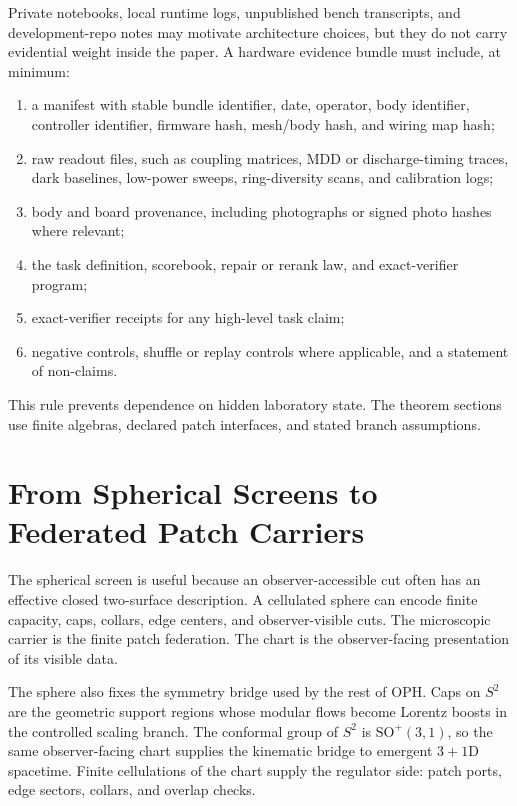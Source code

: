 \documentclass[11pt]{article}
\theoremstyle{remark}
\theoremstyle{plain}
\begin{document}
Private notebooks, local runtime logs, unpublished bench transcripts, and development-repo notes
may motivate architecture choices, but they do not carry evidential weight inside the paper. A
hardware evidence bundle must include, at minimum:
\begin{enumerate}[leftmargin=2em]
\item a manifest with stable bundle identifier, date, operator, body identifier, controller
identifier, firmware hash, mesh/body hash, and wiring map hash;
\item raw readout files, such as coupling matrices, MDD or discharge-timing traces, dark
baselines, low-power sweeps, ring-diversity scans, and calibration logs;
\item body and board provenance, including photographs or signed photo hashes where relevant;
\item the task definition, scorebook, repair or rerank law, and exact-verifier program;
\item exact-verifier receipts for any high-level task claim;
\item negative controls, shuffle or replay controls where applicable, and a statement of
non-claims.
\end{enumerate}

This rule prevents dependence on hidden laboratory state. The theorem sections use finite
algebras, declared patch interfaces, and stated branch assumptions.

\section{From Spherical Screens to Federated Patch Carriers}

The spherical screen is useful because an observer-accessible cut often has an effective closed
two-surface description. A cellulated sphere can encode finite capacity, caps, collars, edge
centers, and observer-visible cuts. The microscopic carrier is the finite patch federation. The
chart is the observer-facing presentation of its visible data.

The sphere also fixes the symmetry bridge used by the rest of OPH. Caps on \(S^2\) are the
geometric support regions whose modular flows become Lorentz boosts in the controlled
scaling branch. The conformal group of \(S^2\) is \(\mathrm{SO}^+(3,1)\), so the same
observer-facing chart supplies the kinematic bridge to emergent \(3+1\)D spacetime. Finite
cellulations of the chart supply the regulator side: patch ports, edge sectors, collars, and
overlap checks.
\end{document}
